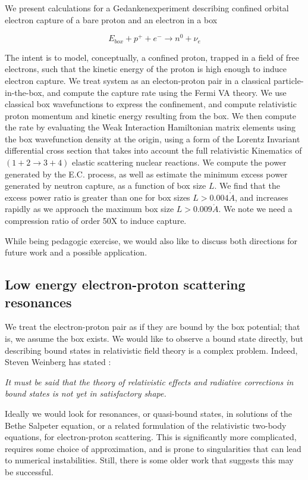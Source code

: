 \documentclass[%
 aip,
 jmp,%
 amsmath,amssymb,
 reprint,%
]{revtex4-1}
\begin{document}
We present calculations for a Gedankenexperiment describing confined orbital electron capture of a bare proton and an electron in a box

$$E_{box}+p^{+}+e^{-}\rightarrow n^{0}+\nu_{e}$$

 The intent is to model, conceptually, a confined proton, trapped in a field of free electrons, such that the kinetic energy of the proton is high enough to induce electron capture.  We treat system as an electon-proton pair in a classical particle-in-the-box, and compute the capture rate using the Fermi VA theory.  We use classical box wavefunctions to express the confinement, and compute relativistic proton momentum and kinetic energy resulting from the box.  We then compute the  rate by evaluating the Weak Interaction Hamiltonian matrix elements using the box wavefunction density at the origin, using a form of the Lorentz Invariant differential cross section that takes into account the full relativistic Kinematics of  $(1+2\rightarrow 3+4)$ elastic scattering nuclear reactions.  We  compute the power generated by the E.C. process, as well as estimate the minimum excess power generated by neutron capture, as a function of box size $L$.  We find that the excess power ratio is greater than one for box sizes $L>0.004\mathring{A}$, and increases rapidly as we approach the maximum box size $L>0.009\mathring{A}$.  We note we need a compression ratio of order 50X to induce capture.

While being pedagogic exercise, we would also like to discuss both directions for future work and a possible application.

\subsection{Low energy electron-proton scattering resonances}
We treat the electron-proton pair as if they are bound by the box potential; that is, we assume the box exists.
We would like to observe a bound state directly, but describing bound states in relativistic field theory is a complex problem.
Indeed, Steven Weinberg has stated \cite{weinberg}:

\emph{It must be said that the theory of relativistic effects and radiative corrections in bound states is not yet in satisfactory shape.}

Ideally we would look for resonances, or quasi-bound states, in solutions of the Bethe Salpeter equation, or a related formulation of the relativistic two-body equations, for electron-proton scattering.  This is significantly more complicated, requires some choice of approximation, and is prone to singularities that can lead to numerical instabilities.  Still, there is some older work that suggests this may be successful.  
\end{document}
